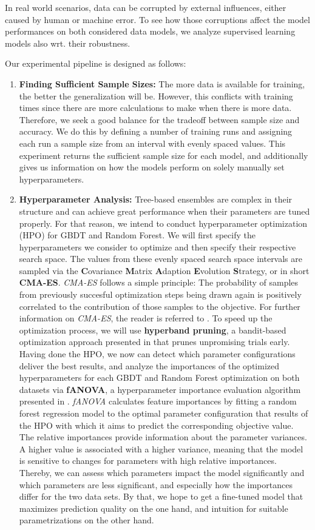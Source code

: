 In real world scenarios, data can be corrupted by external influences, either caused by human or machine error. To see how those corruptions affect the model performances on both considered data models, we analyze supervised learning models also wrt. their robustness. 

Our experimental pipeline is designed as follows:
\begin{enumerate}
	\item \textbf{Finding Sufficient Sample Sizes:} The more data is available for training, the better the generalization will be. However, this conflicts with training times since there are more calculations to make when there is more data. Therefore, we seek a good balance for the tradeoff between sample size and accuracy. We do this by defining a number of training runs and assigning each run a sample size from an interval with evenly spaced values. This experiment returns the sufficient sample size for each model, and additionally gives us information on how the models perform on solely manually set hyperparameters.
	\item \textbf{Hyperparameter Analysis:} Tree-based ensembles are complex in their structure and can achieve great performance when their parameters are tuned properly. For that reason, we intend to conduct hyperparameter optimization (HPO) for GBDT and Random Forest. We will first specify the hyperparameters we consider to optimize and then specify their respective search space. The values from these evenly spaced search space intervals are sampled via the \textbf{C}ovariance \textbf{M}atrix \textbf{A}daption \textbf{E}volution \textbf{S}trategy, or in short \textbf{CMA-ES}. \textit{CMA-ES} follows a simple principle: The probability of samples from previously succesful optimization steps being drawn again is positively correlated to the contribution of those samples to the objective. For further information on \textit{CMA-ES}, the reader is referred to \cite{hansen2016cma}. To speed up the optimization process, we will use \textbf{hyperband pruning}, a bandit-based optimization approach presented in \citet{li2018hyperband} that prunes unpromising trials early. 
	Having done the HPO, we now can detect which parameter configurations deliver the best results, and analyze the importances of the optimized hyperparameters for each GBDT and Random Forest optimization on both datasets via \textbf{fANOVA}, a hyperparameter importance evaluation algorithm presented in \cite{fANOVA}. \textit{fANOVA} calculates feature importances by fitting a random forest regression model to the optimal parameter configuration that results of the HPO with which it aims to predict the corresponding objective value. The relative importances provide information about the parameter variances. A higher value is associated with a higher variance, meaning that the model is sensitive to changes for parameters with high relative importances. Thereby, we can assess which parameters impact the model significantly and which parameters are less significant, and especially how the importances differ for the two data sets. By that, we hope to get a fine-tuned model that maximizes prediction quality on the one hand, and intuition for suitable parametrizations on the other hand.

\end{enumerate}
